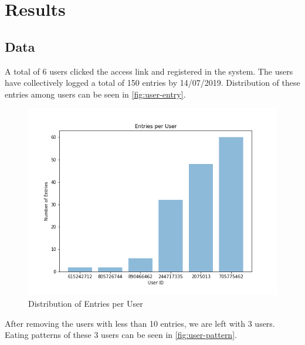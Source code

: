 
\chapter{Results}\label{chapter:results}

\section{Data}
A total of 6 users clicked the access link and registered in the system.
The users have collectively logged a total of 150 entries by 14/07/2019.
Distribution of these entries among users can be seen in \autoref{fig:user-entry}.

\begin{figure}[htbp]
  \centering
  \captionsetup{width=.9\linewidth}
  \includegraphics[scale=0.6]{figures/user-entry}
  \caption{Distribution of Entries per User}
  \label{fig:user-entry}
\end{figure}

After removing the users with less than 10 entries, we are left with 3 users.
Eating patterns of these 3 users can be seen in \autoref{fig:user-pattern}.

